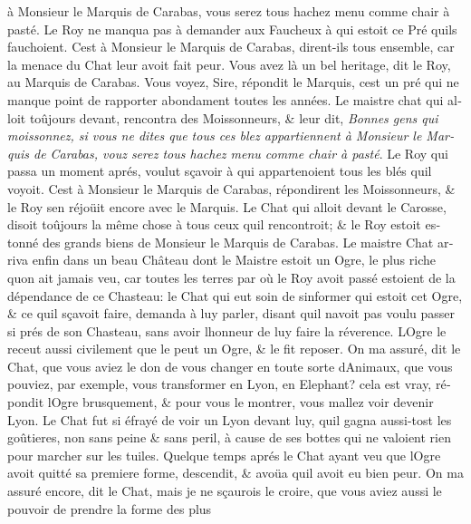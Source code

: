\documentclass[14pt,a4paper]{memoir}
\begin{document}
\begin{otherlanguage}{french}
{à Monsieur le Marquis de Carabas, vous serez tous hachez menu comme
chair à pasté}. Le Roy ne manqua pas à demander aux Faucheux à qui
estoit ce Pré qu\textquotesingle ils fauchoient. C\textquotesingle est à
Monsieur le Marquis de Carabas, dirent-ils tous ensemble, car la menace
du Chat leur avoit fait peur. Vous avez là un bel heritage, dit le Roy,
au Marquis de Carabas. Vous voyez, Sire, répondit le Marquis,
c\textquotesingle est un pré qui ne manque point de rapporter abondament
toutes les années. Le maistre chat qui alloit toûjours devant, rencontra
des Moissonneurs, \& leur dit, \emph{Bonnes gens qui moissonnez, si vous
ne dites que tous ces blez appartiennent à Monsieur le Marquis de
Carabas, vouz serez tous hachez menu comme chair à pasté}. Le Roy qui
passa un moment aprés, voulut sçavoir à qui appartenoient tous les blés
qu\textquotesingle il voyoit. C\textquotesingle est à Monsieur le
Marquis de Carabas, répondirent les Moissonneurs, \& le Roy
s\textquotesingle en réjoüit encore avec le Marquis. Le Chat qui alloit
devant le Carosse, disoit toûjours la même chose à tous ceux
qu\textquotesingle il rencontroit; \& le Roy estoit estonné des grands
biens de Monsieur le Marquis de Carabas. Le maistre Chat arriva enfin
dans un beau Château dont le Maistre estoit un Ogre, le plus riche
qu\textquotesingle on ait jamais veu, car toutes les terres par où le
Roy avoit passé estoient de la dépendance de ce Chasteau: le Chat qui
eut soin de s\textquotesingle informer qui estoit cet Ogre, \& ce
qu\textquotesingle il sçavoit faire, demanda à luy parler, disant
qu\textquotesingle il n\textquotesingle avoit pas voulu passer si prés
de son Chasteau, sans avoir l\textquotesingle honneur de luy faire la
réverence. L\textquotesingle Ogre le receut aussi civilement que le peut
un Ogre, \& le fit reposer. On m\textquotesingle a assuré, dit le Chat,
que vous aviez le don de vous changer en toute sorte
d\textquotesingle Animaux, que vous pouviez, par exemple, vous
transformer en Lyon, en Elephant? cela est vray, répondit
l\textquotesingle Ogre brusquement, \& pour vous le montrer, vous
m\textquotesingle allez voir devenir Lyon. Le Chat fut si éfrayé de voir
un Lyon devant luy, qu\textquotesingle il gagna aussi-tost les
goûtieres, non sans peine \& sans peril, à cause de ses bottes qui ne
valoient rien pour marcher sur les tuiles. Quelque temps aprés le Chat
ayant veu que l\textquotesingle Ogre avoit quitté sa premiere forme,
descendit, \& avoüa qu\textquotesingle il avoit eu bien peur. On
m\textquotesingle a assuré encore, dit le Chat, mais je ne sçaurois le
croire, que vous aviez aussi le pouvoir de prendre la forme des plus

\end{otherlanguage}
\end{document}
